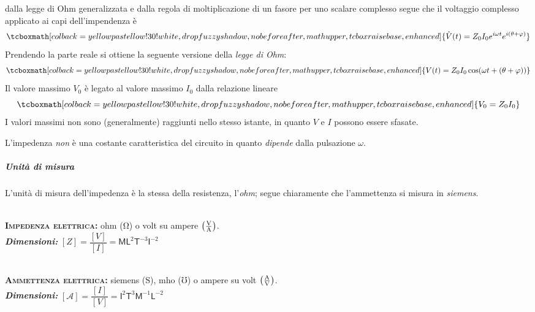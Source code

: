 dalla legge di Ohm generalizzata e dalla regola di moltiplicazione di un fasore per uno scalare complesso segue che il voltaggio complesso applicato ai capi dell'impendenza è
\begin{equation}
	\tcboxmath[colback=yellowpastellow!30!white,drop fuzzy shadow, nobeforeafter, math upper, tcbox raise base, enhanced]{\hat{V}(t)=Z_0I_0e^{i\omega t}e^{i(\theta+\oldphi)}}
\end{equation}
Prendendo la parte reale si ottiene la seguente versione della \textit{legge di Ohm}:
\begin{equation}
	\tcboxmath[colback=yellowpastellow!30!white,drop fuzzy shadow, nobeforeafter, math upper, tcbox raise base, enhanced]{V(t)=Z_0I_0\cos(\omega t+(\theta+\oldphi))}
\end{equation}
Il valore massimo $V_0$ è legato al valore massimo $I_0$ dalla relazione lineare
\begin{equation}
	\tcboxmath[colback=yellowpastellow!30!white,drop fuzzy shadow, nobeforeafter, math upper, tcbox raise base, enhanced]{V_0=Z_0I_0}
\end{equation}
	I valori massimi non sono (generalmente) raggiunti nello stesso istante, in quanto $V$ e $I$ possono essere sfasate.
\begin{observe}
	L'impedenza \textit{non} è una costante caratteristica del circuito in quanto \textit{dipende} dalla pulsazione $\omega$.
\end{observe}
\subparagraph{Unità di misura}
L'unità di misura dell'impedenza è la stessa della resistenza, l'\textit{ohm}; segue chiaramente che l'ammettenza si misura in \textit{siemens}.
\begin{units}~\\
	\textbf{\textsc{Impedenza elettrica:}} ohm ($\unit{\ohm}$) o volt su ampere $\left(\unit[per-mode = fraction]{\volt\per\ampere}\right)$.\\
	\textit{\textbf{Dimensioni:}} $[Z]=\dfrac{[V]}{[I]}=\mathsf{M} \mathsf{L}^2  \mathsf{T}^{-3}\mathsf{I}^{-2}$
\end{units}
\begin{units}~\\
	\textbf{\textsc{Ammettenza elettrica:}} siemens ($\unit{\siemens}$), mho  ($\mho$) o ampere su volt $\left(\unit[per-mode = fraction]{\ampere\per\volt}\right)$.\\
	\textit{\textbf{Dimensioni:}} $[\mathcal{A}]=\dfrac{[I]}{[V]}=\mathsf{I}^{2}\mathsf{T}^{3}\mathsf{M}^{-1} \mathsf{L}^{-2}$
\end{units}
